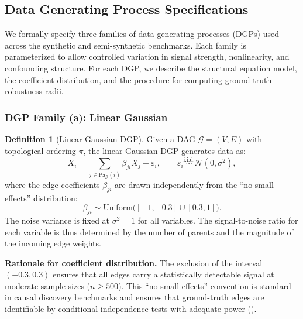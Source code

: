 \documentclass[11pt,a4paper]{article}
\theoremstyle{definition}
\newtheorem{definition}[theorem]{Definition}
\theoremstyle{remark}
\newcommand{\DAG}{\mathcal{G}}
\newcommand{\Pa}{\mathrm{Pa}}
\begin{document}
\subsection{Data Generating Process Specifications}\label{sec:dgp}

We formally specify three families of data generating processes (DGPs)
used across the synthetic and semi-synthetic benchmarks. Each family
is parameterized to allow controlled variation in signal strength,
nonlinearity, and confounding structure. For each DGP, we describe the
structural equation model, the coefficient distribution, and the
procedure for computing ground-truth robustness radii.

\subsubsection{DGP Family (a): Linear Gaussian}

\begin{definition}[Linear Gaussian DGP]\label{def:dgp_linear}
Given a DAG $\DAG = (V, E)$ with topological ordering $\pi$, the
linear Gaussian DGP generates data as:
\[
  X_i = \sum_{j \in \Pa_\DAG(i)} \beta_{ji} X_j + \varepsilon_i,
  \qquad \varepsilon_i \stackrel{\text{i.i.d.}}{\sim} \mathcal{N}(0, \sigma^2),
\]
where the edge coefficients $\beta_{ji}$ are drawn independently from
the ``no-small-effects'' distribution:
\[
  \beta_{ji} \sim \mathrm{Uniform}\bigl([-1, -0.3] \cup [0.3, 1]\bigr).
\]
The noise variance is fixed at $\sigma^2 = 1$ for all variables. The
signal-to-noise ratio for each variable is thus determined by the
number of parents and the magnitude of the incoming edge weights.
\end{definition}

\noindent\textbf{Rationale for coefficient distribution.} The exclusion
of the interval $(-0.3, 0.3)$ ensures that all edges carry a
statistically detectable signal at moderate sample sizes ($n \geq 500$).
This ``no-small-effects'' convention is standard in causal discovery
benchmarks \cite{zheng2018} and ensures that ground-truth edges are
identifiable by conditional independence tests with adequate power
().
\end{document}
